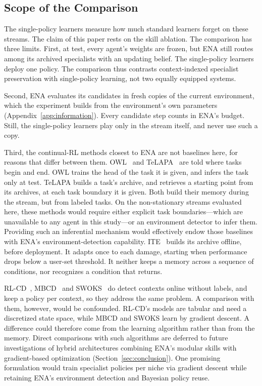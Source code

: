 \subsection{Scope of the Comparison}
\label{sec:scope}
The single-policy learners measure how much standard learners forget on these streams. The claim of this paper rests on the skill ablation. The comparison has three limits. First, at test, every agent's weights are frozen, but ENA still routes among its archived specialists with an updating belief. The single-policy learners deploy one policy. The comparison thus contrasts context-indexed specialist preservation with single-policy learning, not two equally equipped systems.

Second, ENA evaluates its candidates in fresh copies of the current environment, which the experiment builds from the environment's own parameters (Appendix~\ref{app:information}). Every candidate step counts in ENA's budget. Still, the single-policy learners play only in the stream itself, and never use such a copy.

Third, the continual-RL methods closest to ENA are not baselines here, for reasons that differ between them. OWL~\cite{kessler2022same} and TeLAPA~\cite{lillo2026beyond} are told where tasks begin and end. OWL trains the head of the task it is given, and infers the task only at test. TeLAPA builds a task's archive, and retrieves a starting point from its archives, at each task boundary it is given. Both build their memory during the stream, but from labeled tasks. On the non-stationary streams evaluated here, these methods would require either explicit task boundaries---which are unavailable to any agent in this study---or an environment detector to infer them. Providing such an inferential mechanism would effectively endow those baselines with ENA's environment-detection capability. ITE~\cite{cully2015robots} builds its archive offline, before deployment. It adapts once to each damage, starting when performance drops below a user-set threshold. It neither keeps a memory across a sequence of conditions, nor recognizes a condition that returns.

RL-CD~\cite{dasilva2006dealing}, MBCD~\cite{alegre2021minimum} and SWOKS~\cite{dick2024statistical} do detect contexts online without labels, and keep a policy per context, so they address the same problem. A comparison with them, however, would be confounded. RL-CD's models are tabular and need a discretized state space, while MBCD and SWOKS learn by gradient descent. A difference could therefore come from the learning algorithm rather than from the memory. Direct comparisons with such algorithms are deferred to future investigations of hybrid architectures combining ENA's modular skills with gradient-based optimization (Section~\ref{sec:conclusion}). One promising formulation would train specialist policies per niche via gradient descent while retaining ENA's environment detection and Bayesian policy reuse.

